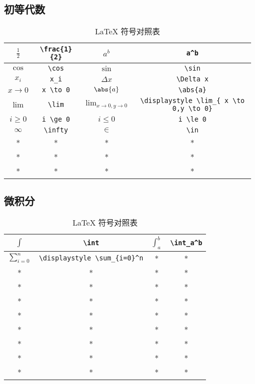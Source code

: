 
\subsection{初等代数}
\begin{table}[ht]
\centering
\caption{LaTeX 符号对照表}\label{tab_TeXSym0}
\begin{tabular}{|c|c|c|c|}
\hline
$\frac{1}{2}$ & \verb|\frac{1}{2}| & $a^b$ & \verb|a^b| \\
\hline
$\cos$ & \verb|\cos| & $\sin$ & \verb|\sin| \\
\hline
$x_i$ & \verb|x_i| & $\Delta x$& \verb|\Delta x| \\
\hline
$x \to 0$ & \verb|x \to 0| & $\abs{a}$ & \verb|\abs{a}| \\
\hline
$\lim$ & \verb|\lim| & $\displaystyle \lim_{ x \to 0,y \to 0}$ & \verb|\displaystyle \lim_{ x \to 0,y \to 0}| \\
\hline
$i \ge 0$& \verb|i \ge 0| & $i \le 0$ & \verb|i \le 0| \\
\hline
$\infty$ & \verb|\infty| & $\in$ & \verb|\in| \\
\hline
* & * & * & * \\
\hline
* & * & * & * \\
\hline
* & * & * & * \\
\hline
\end{tabular}
\end{table}


\subsection{微积分}
\begin{table}[ht]
\centering
\caption{LaTeX 符号对照表}\label{tab_TeXSym1}
\begin{tabular}{|c|c|c|c|}
\hline
$\int$ & \verb|\int| & $\int_a^b$ & \verb|\int_a^b| \\
\hline
$\displaystyle \sum_{i=0}^n$ & \verb|\displaystyle \sum_{i=0}^n| & * & * \\
\hline
* & * & * & * \\
\hline
* & * & * & * \\
\hline
* & * & * & * \\
\hline
* & * & * & * \\
\hline
* & * & * & * \\
\hline
* & * & * & * \\
\hline
* & * & * & * \\
\hline
* & * & * & * \\
\hline
\end{tabular}
\end{table}
